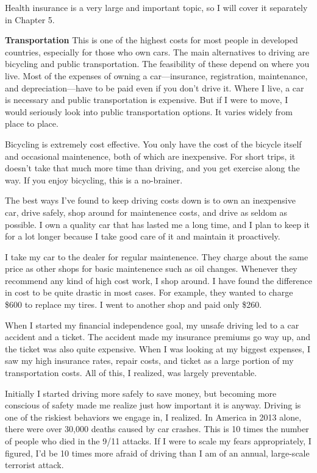Health insurance is a very large and important topic, so I will cover it separately in Chapter 5.

\textbf{Transportation}
This is one of the highest costs for most people in developed countries, especially for those who own cars. The main alternatives to driving are bicycling and public transportation. The feasibility of these depend on where you live. Most of the expenses of owning a car---insurance, registration, maintenance, and depreciation---have to be paid even if you don't drive it. Where I live, a car is necessary and public transportation is expensive. But if I were to move, I would seriously look into public transportation options. It varies widely from place to place.

Bicycling is extremely cost effective. You only have the cost of the bicycle itself and occasional maintenence, both of which are inexpensive. For short trips, it doesn't take that much more time than driving, and you get exercise along the way. If you enjoy bicycling, this is a no-brainer.

The best ways I've found to keep driving costs down is to own an inexpensive car, drive safely, shop around for maintenence costs, and drive as seldom as possible. I own a quality car that has lasted me a long time, and I plan to keep it for a lot longer because I take good care of it and maintain it proactively.

I take my car to the dealer for regular maintenence. They charge about the same price as other shops for basic maintenence such as oil changes. Whenever they recommend any kind of high cost work, I shop around. I have found the difference in cost to be quite drastic in most cases. For example, they wanted to charge \$600 to replace my tires. I went to another shop and paid only \$260.

When I started my financial independence goal, my unsafe driving led to a car accident and a ticket. The accident made my insurance premiums go way up, and the ticket was also quite expensive. When I was looking at my biggest expenses, I saw my high insurance rates, repair costs, and ticket as a large portion of my transportation costs. All of this, I realized, was largely preventable.

Initially I started driving more safely to save money, but becoming more conscious of safety made me realize just how important it is anyway. Driving is one of the riskiest behaviors we engage in, I realized. In America in 2013 alone, there were over 30,000 deaths caused by car crashes.\cite{fatality-facts} This is 10 times the number of people who died in the 9/11 attacks.\cite{wikipedia-9-11} If I were to scale my fears appropriately, I figured, I'd be 10 times more afraid of driving than I am of an annual, large-scale terrorist attack.

